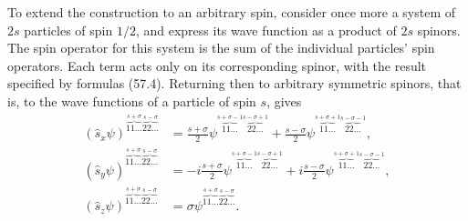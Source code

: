 To extend the construction to an arbitrary spin, consider once more a system
of $2s$ particles of spin $1/2$, and express its wave function as a product of
$2s$ spinors. The spin operator for this system is the sum of the individual
particles' spin operators. Each term acts only on its corresponding spinor,
with the result specified by formulas (57.4). Returning then to arbitrary
symmetric spinors, that is, to the wave functions of a particle of spin $s$,
gives
\begin{equation}
 \begin{aligned}
 (\hat s_x\psi)^{\overbrace{11\ldots}^{s+\sigma}
                         \overbrace{22\ldots}^{s-\sigma}}
 &=\frac{s+\sigma}{2}\psi^{\overbrace{11\ldots}^{s+\sigma-1}
                                  \overbrace{22\ldots}^{s-\sigma+1}}
 +\frac{s-\sigma}{2}\psi^{\overbrace{11\ldots}^{s+\sigma+1}
                                  \overbrace{22\ldots}^{s-\sigma-1}},\\
 (\hat s_y\psi)^{\overbrace{11\ldots}^{s+\sigma}
                         \overbrace{22\ldots}^{s-\sigma}}
 &=-i\frac{s+\sigma}{2}\psi^{\overbrace{11\ldots}^{s+\sigma-1}
                                   \overbrace{22\ldots}^{s-\sigma+1}}
 +i\frac{s-\sigma}{2}\psi^{\overbrace{11\ldots}^{s+\sigma+1}
                                  \overbrace{22\ldots}^{s-\sigma-1}},\\
 (\hat s_z\psi)^{\overbrace{11\ldots}^{s+\sigma}
                         \overbrace{22\ldots}^{s-\sigma}}
 &=\sigma\psi^{\overbrace{11\ldots}^{s+\sigma}
                       \overbrace{22\ldots}^{s-\sigma}}.
 \end{aligned}
 \tag{57.5}
\end{equation}
